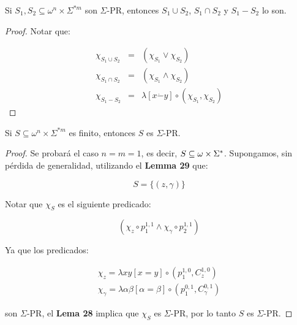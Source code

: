   \begin{lemma}
    \PN Si $S_{1}, S_{2} \subseteq \omega^{n} \times \Sigma^{\ast m}$ son $\Sigma$-PR, entonces $S_{1} \cup S_{2}$,
    $S_{1} \cap S_{2}$ y $S_{1} - S_{2}$ lo son.
  \end{lemma}
  \begin{proof}
    \PN Notar que:

    \begin{eqnarray*}
      \chi_{S_{1} \cup S_{2}} &=& (\chi_{S_{1}} \vee \chi_{S_{2}}) \\
      \chi_{S_{1} \cap S_{2}} &=& (\chi_{S_{1}} \wedge \chi_{S_{2}}) \\
      \chi_{S_{1} - S_{2}} &=& \lambda \left[x \dot{-} y\right] \circ (\chi_{S_{1}}, \chi_{S_{2}})
    \end{eqnarray*}
  \end{proof}

  \begin{corollary}
    \PN Si $S \subseteq \omega^{n} \times \Sigma^{\ast m}$ es finito, entonces $S$ es $\Sigma$-PR.
  \end{corollary}
  \begin{proof}
    \PN Se probará el caso $n = m = 1$, es decir, $S \subseteq \omega \times \Sigma^{\ast}$. Supongamos, sin pérdida de
    generalidad, utilizando el \textbf{Lemma 29} que:

    \[
      S = \{(z, \gamma)\}
    \]

    \PN Notar que $\chi_{S}$ es el siguiente predicado:

    \[
      \left(\chi_{z} \circ p_{1}^{1,1} \wedge \chi_{\gamma} \circ p_{2}^{1,1}\right)
    \]

    \PN Ya que los predicados:

    \begin{eqnarray*}
      \chi_{z} = \lambda xy \left[x = y\right] \circ \left(p_{1}^{1,0}, C_{z}^{1,0}\right) \\
      \chi_{\gamma} = \lambda \alpha\beta \left[\alpha = \beta\right] \circ \left(p_{1}^{0,1},
      C_{\gamma}^{0,1}\right)
    \end{eqnarray*}

    \PN son $\Sigma$-PR, el \textbf{Lema 28} implica que $\chi_{S}$ es $\Sigma$-PR, por lo tanto $S$ es $\Sigma$-PR.
  \end{proof}

